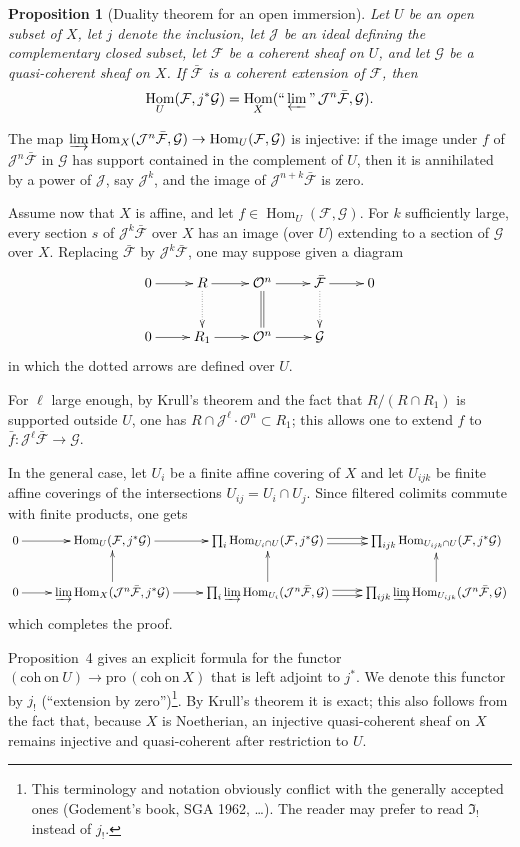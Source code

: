 \documentclass[11pt]{amsart}
\DeclareMathOperator{\Hom}{Hom}
\newcommand{\Pro}{\text{pro}\,}
\newcommand{\cF}{\mathcal{F}}
\newcommand{\cG}{\mathcal{G}}
\newcommand{\cJ}{\mathcal{J}}
\newcommand{\cO}{\mathcal{O}}
\theoremstyle{plain}
\newtheorem{prop}{Proposition}
\theoremstyle{definition}
\begin{document}
\begin{prop}[Duality theorem for an open immersion]
Let $U$ be an open subset of $X$, let $j$ denote the inclusion, let $\cJ$ be an ideal defining the complementary closed subset, let $\cF$ be a coherent sheaf on $U$, and let $\cG$ be a quasi-coherent sheaf on $X$. If $\bar{\cF}$ is a coherent extension of $\cF$, then
\begin{equation}
\Hom_U(\cF,j^*\cG)=\Hom_X(\text{``}\varprojlim\text{''}\,\cJ^n\bar{\cF},\cG).
\end{equation}
\end{prop}

The map $\varinjlim \Hom_X(\cJ^n\bar{\cF},\cG)\to \Hom_U(\cF,\cG)$ is injective: if the image under $f$ of $\cJ^n\bar{\cF}$ in $\cG$ has support contained in the complement of $U$, then it is annihilated by a power of $\cJ$, say $\cJ^k$, and the image of $\cJ^{n+k}\bar{\cF}$ is zero.

Assume now that $X$ is affine, and let $f\in\Hom_U(\cF,\cG)$. For $k$ sufficiently large, every section $s$ of $\cJ^k\bar{\cF}$ over $X$ has an image (over $U$) extending to a section of $\cG$ over $X$. Replacing $\bar{\cF}$ by $\cJ^k\bar{\cF}$, one may suppose given a diagram
\[
\xymatrix{
0 \ar[r] & R \ar[r] \ar@{.>}[d] & \cO^n \ar[r] \ar@{=}[d] & \bar{\cF} \ar[r] \ar@{.>}[d] & 0 \\
0 \ar[r] & R_1 \ar[r] & \cO^n \ar[r] & \cG &
}
\]
in which the dotted arrows are defined over $U$.

For $\ell$ large enough, by Krull's theorem and the fact that $R/(R\cap R_1)$ is supported outside $U$, one has $R\cap \cJ^\ell\cdot\cO^n\subset R_1$; this allows one to extend $f$ to $\bar f\colon \cJ^\ell\bar{\cF}\to \cG$.

In the general case, let $U_i$ be a finite affine covering of $X$ and let $U_{ijk}$ be finite affine coverings of the intersections $U_{ij}=U_i\cap U_j$. Since filtered colimits commute with finite products, one gets
\[
\xymatrix{
0 \ar[r] & \Hom_U(\cF,j^*\cG) \ar[r] & \prod_i \Hom_{U_i\cap U}(\cF,j^*\cG) \ar@<.5ex>[r] \ar@<-.5ex>[r] & \prod_{ijk} \Hom_{U_{ijk}\cap U}(\cF,j^*\cG) \\
0 \ar[r] & \varinjlim \Hom_X(\cJ^n\bar{\cF},j^*\cG) \ar[r] \ar[u] & \prod_i \varinjlim \Hom_{U_i}(\cJ^n\bar{\cF},\cG) \ar@<.5ex>[r] \ar@<-.5ex>[r] \ar[u] & \prod_{ijk} \varinjlim \Hom_{U_{ijk}}(\cJ^n\bar{\cF},\cG) \ar[u]
}
\]
which completes the proof.

Proposition~4 gives an explicit formula for the functor $(\mathrm{coh\ on\ }U)\to \Pro(\mathrm{coh\ on\ }X)$ that is left adjoint to $j^*$. We denote this functor by $j_!$ (``extension by zero'')\footnote{This terminology and notation obviously conflict with the generally accepted ones (Godement's book, SGA 1962, \dots). The reader may prefer to read $\mathfrak{I}_!$ instead of $j_!$.}. By Krull's theorem it is exact; this also follows from the fact that, because $X$ is Noetherian, an injective quasi-coherent sheaf on $X$ remains injective and quasi-coherent after restriction to $U$.
\end{document}

